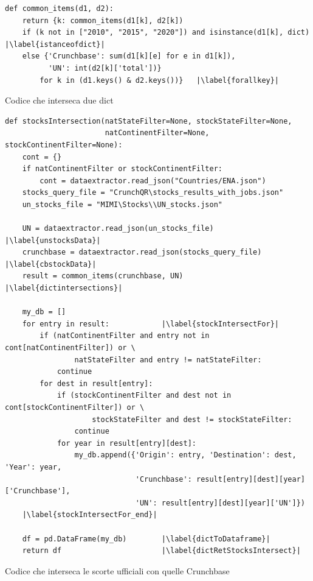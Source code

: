 \begin{listing}[htbp]
\begin{verbatim}
def common_items(d1, d2):
    return {k: common_items(d1[k], d2[k]) 
    if (k not in ["2010", "2015", "2020"]) and isinstance(d1[k], dict) |\label{istanceofdict}|
    else {'Crunchbase': sum(d1[k][e] for e in d1[k]), 
          'UN': int(d2[k]['total'])}
        for k in (d1.keys() & d2.keys())}   |\label{forallkey}| 
\end{verbatim}
\caption{Codice che interseca due dict}
\label{lst:dictIntersect}
\begin{verbatim}
def stocksIntersection(natStateFilter=None, stockStateFilter=None,
                       natContinentFilter=None, stockContinentFilter=None):
    cont = {}
    if natContinentFilter or stockContinentFilter:
        cont = dataextractor.read_json("Countries/ENA.json")
    stocks_query_file = "CrunchQR\stocks_results_with_jobs.json"
    un_stocks_file = "MIMI\Stocks\\UN_stocks.json"

    UN = dataextractor.read_json(un_stocks_file)                |\label{unstocksData}|
    crunchbase = dataextractor.read_json(stocks_query_file)     |\label{cbstockData}|
    result = common_items(crunchbase, UN)   |\label{dictintersections}|

    my_db = []
    for entry in result:            |\label{stockIntersectFor}|
        if (natContinentFilter and entry not in cont[natContinentFilter]) or \
                natStateFilter and entry != natStateFilter:
            continue
        for dest in result[entry]:
            if (stockContinentFilter and dest not in cont[stockContinentFilter]) or \
                    stockStateFilter and dest != stockStateFilter:
                continue
            for year in result[entry][dest]:
                my_db.append({'Origin': entry, 'Destination': dest, 'Year': year,
                              'Crunchbase': result[entry][dest][year]['Crunchbase'],
                              'UN': result[entry][dest][year]['UN']})
    |\label{stockIntersectFor_end}|

    df = pd.DataFrame(my_db)        |\label{dictToDataframe}|
    return df                       |\label{dictRetStocksIntersect}|
\end{verbatim}
\caption{Codice che interseca le scorte ufficiali con quelle Crunchbase}
\label{lst:stockIntersect}
\end{listing}


